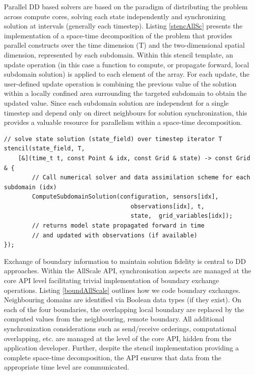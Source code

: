 \documentclass[acmsmall,review,anonymous]{acmart}\settopmatter{printfolios=true,printccs=false,printacmref=false}
\begin{document}
Parallel DD based solvers are based on the paradigm of distributing the problem across compute cores, solving each state independently and synchronizing solution at intervals (generally each timestep). Listing \ref{stencAllSc} presents the implementation of a space-time decomposition of the problem that provides parallel constructs over the time dimension (T) and the two-dimensional spatial dimension, represented by each subdomain. Within this stencil template, an update operation (in this case a function to compute, or propagate forward, local subdomain solution) is applied to each element of the array. For each update, the user-defined update operation is combining the previous value of the solution within a locally confined area surrounding the targeted subdomain to obtain the updated value. Since each subdomain solution are independent for a single timestep and depend only on direct neighbours for solution synchronization, this provides a valuable resource for parallelism within a space-time decomposition. 

\begin{lstlisting}[caption=AllScale Stencil parallel computation, label=stencAllSc]
// solve state solution (state_field) over timestep iterator T
stencil(state_field, T,
    [&](time_t t, const Point & idx, const Grid & state) -> const Grid & {
        // Call numerical solver and data assimilation scheme for each subdomain (idx)
        ComputeSubdomainSolution(configuration, sensors[idx],
                                    observations[idx], t,
                                    state,  grid_variables[idx]);
        // returns model state propagated forward in time
        // and updated with observations (if available)
});
\end{lstlisting}

Exchange of boundary information to maintain solution fidelity is central to DD approaches. Within the AllScale API, synchronisation aspects are managed at the core API level facilitating trivial implementation of boundary exchange operations. Listing \ref{boundAllScale} outlines how we code boundary exchanges. Neighbouring domains are identified via Boolean data types (if they exist). On each of the four boundaries, the overlapping local boundary are replaced by the computed values from the neighbouring, remote boundary. All additional synchronization considerations such as send/receive orderings, computational overlapping, etc. are managed at the level of the core API, hidden from the application developer. Further, despite the stencil implementation providing a complete space-time decomposition, the API ensures that data from the appropriate time level are communicated. 
\end{document}
